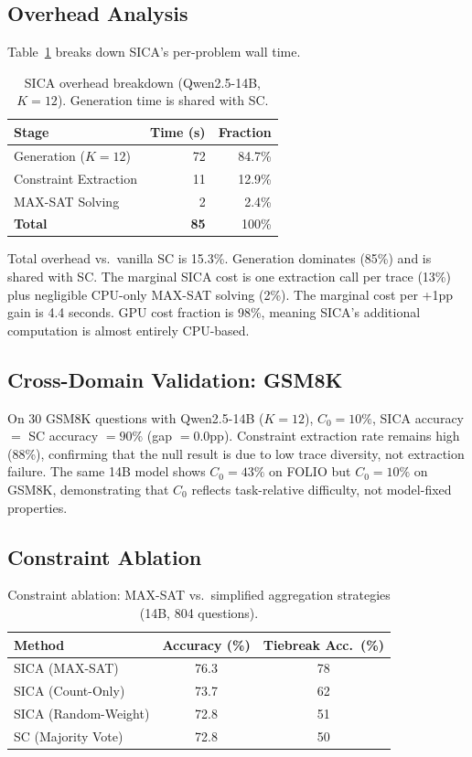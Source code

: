 \documentclass[11pt,a4paper]{article}
\begin{document}
\subsection{Overhead Analysis}
\label{sec:overhead}

Table~\ref{tab:overhead} breaks down SICA's per-problem wall time.

\begin{table}[t]
\centering
\small
\caption{SICA overhead breakdown (Qwen2.5-14B, $K=12$). Generation time is shared with SC.}
\label{tab:overhead}
\begin{tabular}{lrr}
\toprule
\textbf{Stage} & \textbf{Time (s)} & \textbf{Fraction} \\
\midrule
Generation ($K=12$) & 72 & 84.7\% \\
Constraint Extraction & 11 & 12.9\% \\
MAX-SAT Solving & 2 & 2.4\% \\
\midrule
\textbf{Total} & \textbf{85} & 100\% \\
\bottomrule
\end{tabular}
\end{table}

Total overhead vs.\ vanilla SC is 15.3\%. Generation dominates (85\%) and is shared with SC. The marginal SICA cost is one extraction call per trace (13\%) plus negligible CPU-only MAX-SAT solving (2\%). The marginal cost per +1pp gain is 4.4 seconds. GPU cost fraction is 98\%, meaning SICA's additional computation is almost entirely CPU-based.

\subsection{Cross-Domain Validation: GSM8K}
\label{sec:gsm8k}

On 30 GSM8K questions with Qwen2.5-14B ($K=12$), $C_0=10\%$, SICA accuracy $=$ SC accuracy $= 90\%$ (gap $= 0.0$pp). Constraint extraction rate remains high (88\%), confirming that the null result is due to low trace diversity, not extraction failure. The same 14B model shows $C_0=43\%$ on FOLIO but $C_0=10\%$ on GSM8K, demonstrating that $C_0$ reflects task-relative difficulty, not model-fixed properties.

\subsection{Constraint Ablation}
\label{sec:ablation}

\begin{table}[t]
\centering
\small
\caption{Constraint ablation: MAX-SAT vs.\ simplified aggregation strategies (14B, 804 questions).}
\label{tab:ablation}
\begin{tabular}{lcc}
\toprule
\textbf{Method} & \textbf{Accuracy (\%)} & \textbf{Tiebreak Acc.\ (\%)} \\
\midrule
SICA (MAX-SAT) & 76.3 & 78 \\
SICA (Count-Only) & 73.7 & 62 \\
SICA (Random-Weight) & 72.8 & 51 \\
SC (Majority Vote) & 72.8 & 50 \\
\bottomrule
\end{tabular}
\end{table}
\end{document}

